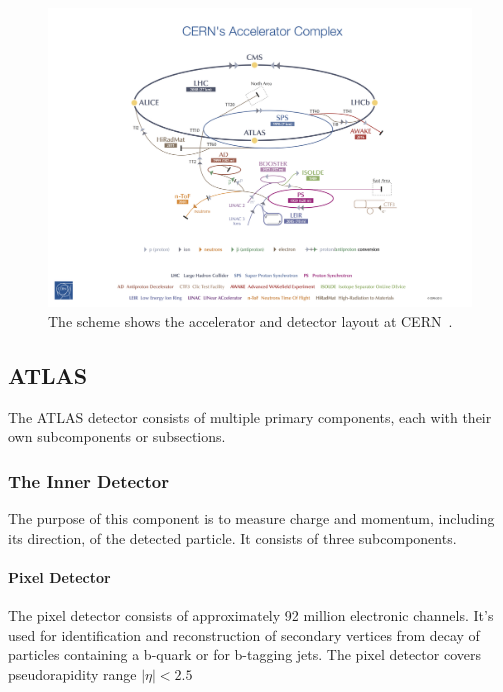 \documentclass[12pt,a4paper]{article}
\numberwithin{equation}{section}
\begin{document}
\begin{figure}[H]
	\includegraphics[width=\linewidth]{figures/cern.jpg}
	\caption{The scheme shows the accelerator and detector layout at
    CERN~\cite{Haffner:1621894}.}\label{fig:lhc}
\end{figure}


\subsection{ATLAS}


The ATLAS detector consists of multiple primary components, each with their own
subcomponents or subsections.

\subsubsection{The Inner Detector}
The purpose of this component is to measure charge and momentum, including its
direction, of the detected particle. It consists of three subcomponents. 
\paragraph{Pixel Detector}
The pixel detector consists of approximately 92 million electronic channels.
It's used for identification and reconstruction of secondary vertices from decay
of particles containing a b-quark or for b-tagging jets. The pixel detector
covers pseudorapidity range $|\eta| < 2.5 $
\end{document}
